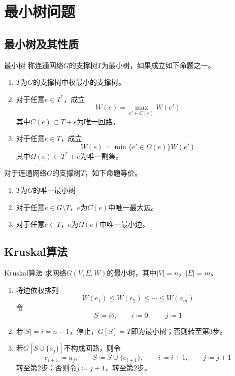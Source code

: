 \documentclass[lang = cn, scheme = chinese, thmcnt = section]{elegantbook}
\newcommand{\sub}{\subset}             %
\begin{document}
\section{最小树问题}

\subsection{最小树及其性质}

\begin{definition}{最小树}
	称连通网络$G$的支撑树$T$为最小树，如果成立如下命题之一。
	\begin{enumerate}
		\item $T$为$G$的支撑树中权最小的支撑树。
		\item 对于任意$e\in T^*$，成立%
		$$
		W(e)=\max_{e'\in C(e)}W(e')
		$$
		其中$C(e)\sub T+e$为唯一回路。
		\item 对于任意$e\in T$，成立%
		$$
		W(e)=\min\{ e'\in \Omega(e) \}W(e')
		$$
		其中$\Omega(e)\sub T^*+e$为唯一割集。
	\end{enumerate}
\end{definition}

\begin{theorem}
	对于连通网络$G$的支撑树$T$，如下命题等价。
	\begin{enumerate}
		\item $T$为$G$的唯一最小树
		\item 对于任意$e\in G\setminus T$，$e$为$C(e)$中唯一最大边。
		\item 对于任意$e\in T$，$e$为$\Omega(e)$中唯一最小边。
	\end{enumerate}
\end{theorem}

\subsection{Kruskal算法}

\begin{theorem}{Kruskal算法}
	求网络$G(V,E,W)$的最小树，其中$|V|=n$，$|E|=m$。
	\begin{enumerate}
		\item 将边依权排列%
		$$
		W(e_1)\le W(e_2)\le \cdots \le W(a_m)
		$$
		令
		$$
		S\coloneqq \varnothing,\qquad 
		i\coloneqq 0,\qquad 
		j\coloneqq 1
		$$
		\item 若$|S|=i=n-1$，停止，$G[S]=T$即为最小树；否则转至第3步。
		\item 若$G[S\cup \{ a_j \}]$不构成回路，则令%
		$$
		e_{i+1}\coloneqq a_j,\qquad 
		S\coloneqq S\cup\{ e_{i+1} \},\qquad 
		i\coloneqq i+1,\qquad
		j\coloneqq j+1
		$$
		转至第2步；否则令$j\coloneqq j+1$，转至第$2$步。
	\end{enumerate}
\end{theorem}
\end{document}
